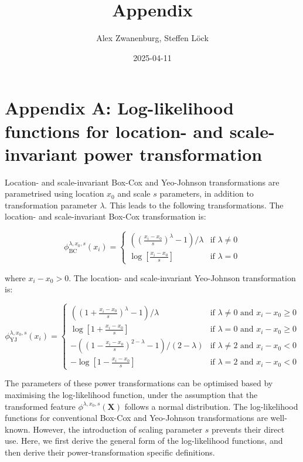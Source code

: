 \documentclass[
  a4paper,
]{article}
\title{Appendix}
\author{Alex Zwanenburg, Steffen Löck}
\date{2025-04-11}
\begin{document}
\maketitle

\section{Appendix A: Log-likelihood functions for location- and
scale-invariant power
transformation}\label{appendix-a-log-likelihood-functions-for-location--and-scale-invariant-power-transformation}

Location- and scale-invariant Box-Cox and Yeo-Johnson transformations
are parametrised using location \(x_0\) and scale \(s\) parameters, in
addition to transformation parameter \(\lambda\). This leads to the
following transformations. The location- and scale-invariant Box-Cox
transformation is:

\begin{equation}
\phi_{\text{BC}}^{\lambda, x_0, s} (x_i) = 
\begin{cases}
\left( \left(\frac{x_i - x_0}{s} \right)^\lambda - 1 \right) / \lambda & \text{if } \lambda \neq 0\\
\log\left[\frac{x_i - x_0}{s}\right] & \text{if } \lambda = 0
\end{cases}
\end{equation}

where \(x_i - x_0 > 0\). The location- and scale-invariant Yeo-Johnson
transformation is:

\begin{equation}
\phi_{\text{YJ}}^{\lambda, x_0, s} (x_i) = 
\begin{cases}
\left( \left( 1 + \frac{x_i - x_0}{s}\right)^\lambda - 1\right) / \lambda & \text{if } \lambda \neq 0 \text{ and } x_i - x_0 \geq 0\\
\log\left[1 + \frac{x_i - x_0}{s}\right] & \text{if } \lambda = 0 \text{ and } x_i - x_0 \geq 0\\
-\left( \left( 1 - \frac{x_i - x_0}{s}\right)^{2 - \lambda} - 1 \right) / \left(2 - \lambda \right) & \text{if } \lambda \neq 2 \text{ and } x_i - x_0 < 0\\
-\log\left[1 - \frac{x_i - x_0}{s}\right] & \text{if } \lambda = 2 \text{ and } x_i - x_0 < 0
\end{cases}
\end{equation}

The parameters of these power transformations can be optimised based by
maximising the log-likelihood function, under the assumption that the
transformed feature \(\phi^{\lambda, x_0, s} (\mathbf{X})\) follows a
normal distribution. The log-likelihood functions for conventional
Box-Cox and Yeo-Johnson transformations are well-known. However, the
introduction of scaling parameter \(s\) prevents their direct use. Here,
we first derive the general form of the log-likelihood functions, and
then derive their power-transformation specific definitions.
\end{document}
